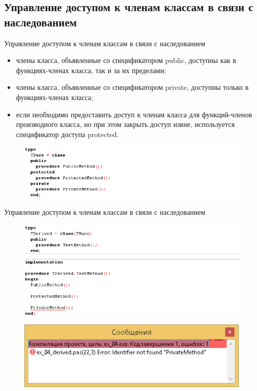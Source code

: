 \documentclass{beamer}
\begin{document}
\subsection{Управление доступом к членам классам в связи с наследованием}
\begin{frame}{Управление доступом к членам классам в связи с наследованием}
\begin{itemize}
\item члены класса, объявленные со спецификатором public, доступны как в функциях-членах класса, так и за их пределами;
\item члены класса, объявленные со спецификатором private, доступны только в
функциях-членах класса;
\item если необходимо предоставить доступ к членам класса для функций-членов производного класса, но при этом закрыть доступ извне, используется спецификатор доступа protected.
\end{itemize}
\begin{figure}[h]
\centering
\includegraphics[scale=0.5]{images/lec06-pic32.png}
\end{figure}
\end{frame}

\begin{frame}{Управление доступом к членам классам в связи с наследованием}
\begin{figure}[h]
\centering
\includegraphics[scale=0.5]{images/lec06-pic33.png}
\end{figure}
\begin{figure}[h]
\centering
\includegraphics[scale=0.5]{images/lec06-pic34.png}
\end{figure}
\end{frame}
\end{document}
